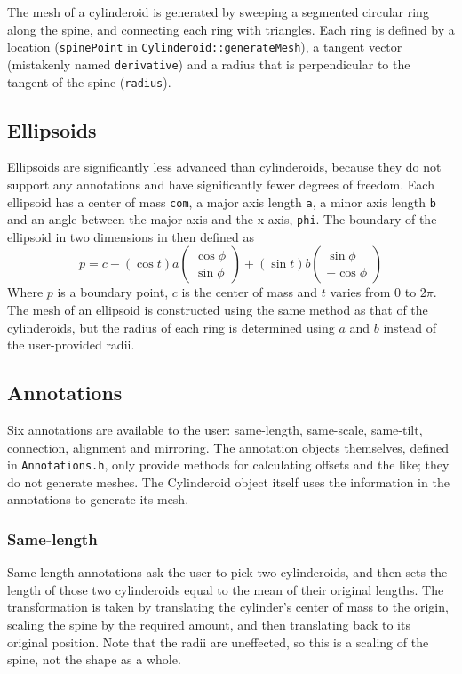 The mesh of a cylinderoid is generated by sweeping a segmented circular ring
along the spine, and connecting each ring with triangles. Each ring is defined
by a location (\verb#spinePoint# in \verb#Cylinderoid::generateMesh#), a tangent
vector (mistakenly named \verb#derivative#) and a radius that is perpendicular
to the tangent of the spine (\verb#radius#).

\subsection{Ellipsoids}
Ellipsoids are significantly less advanced than cylinderoids, because they do
not support any annotations and have significantly fewer degrees of freedom.
Each ellipsoid has a center of mass \verb#com#, a major axis length \verb#a#, a
minor axis length \verb#b# and an angle between the major axis and the x-axis,
\verb#phi#. The boundary of the ellipsoid in two dimensions in then defined as
\begin{equation*}
p = c + (\cos t) a 
	\left(\begin{smallmatrix}\cos \phi\\ \sin \phi\end{smallmatrix} \right)
	+ (\sin t) b
	\left(\begin{smallmatrix}\sin \phi\\ -\cos \phi\end{smallmatrix} \right)
\end{equation*}
Where $p$ is a boundary point, $c$ is the center of mass and $t$ varies from 0
to $2\pi$. The mesh of an ellipsoid is constructed using the same method as that
of the cylinderoids, but the radius of each ring is determined using $a$ and $b$
instead of the user-provided radii.

\subsection{Annotations}
Six annotations are available to the user: same-length, same-scale, same-tilt,
connection, alignment and mirroring. The annotation objects themselves, defined
in \verb#Annotations.h#, only provide methods for calculating offsets and the
like; they do not generate meshes. The Cylinderoid object itself uses the
information in the annotations to generate its mesh.

\subsubsection{Same-length}
Same length annotations ask the user to pick two cylinderoids, and then sets the
length of those two cylinderoids equal to the mean of their original lengths.
The transformation is taken by translating the cylinder's center of mass to the
origin, scaling the spine by the required amount, and then translating back to
its original position. Note that the radii are uneffected, so this is a scaling
of the spine, not the shape as a whole.


